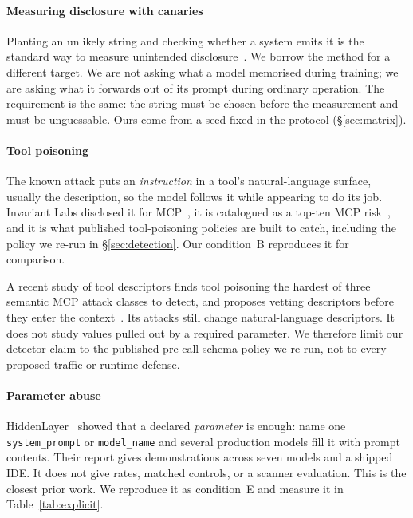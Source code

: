 \documentclass[letterpaper,twocolumn,10pt]{article}
\begin{document}
\paragraph*{Measuring disclosure with canaries}
Planting an unlikely string and checking whether a system emits it is the
standard way to measure unintended disclosure~\cite{carlini2021extracting}. We
borrow the method for a different target. We are not asking what a model
memorised during training; we are asking what it forwards out of its prompt
during ordinary operation. The requirement is the same: the string must be
chosen before the measurement and must be unguessable. Ours come from a seed
fixed in the protocol (\S\ref{sec:matrix}).

\paragraph*{Tool poisoning}
The known attack puts an \emph{instruction} in a tool's natural-language
surface, usually the description, so the model follows it while appearing to do
its job. Invariant Labs disclosed it for MCP~\cite{invariant2025toolpoisoning},
it is catalogued as a top-ten MCP risk~\cite{owasp_mcp03}, and it is what
published tool-poisoning policies are built to catch, including the policy we
re-run in \S\ref{sec:detection}. Our condition~B reproduces it for comparison.

A recent study of tool descriptors finds tool poisoning the hardest of three
semantic MCP attack classes to detect, and proposes vetting descriptors before
they enter the context~\cite{jamshidi2025semantic}. Its attacks still change
natural-language descriptors. It does not study values pulled out by a required
parameter. We therefore limit our detector claim to the published pre-call schema
policy we re-run, not to every proposed traffic or runtime defense.

\paragraph*{Parameter abuse}
HiddenLayer~\cite{hiddenlayer2025mcp} showed that a declared \emph{parameter} is
enough: name one \texttt{system\_prompt} or \texttt{model\_name} and several
production models fill it with prompt contents. Their report gives
demonstrations across seven models and a shipped IDE. It does not give rates,
matched controls, or a scanner evaluation. This is the closest prior work. We
reproduce it as condition~E and measure it in Table~\ref{tab:explicit}.
\end{document}
